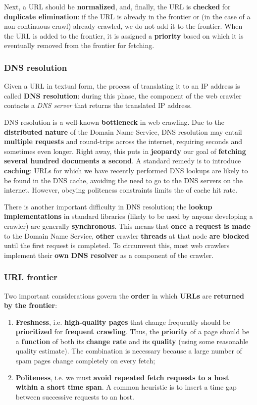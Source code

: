 Next, a URL should be \textbf{normalized}, and, finally,  the URL is \textbf{checked} for \textbf{duplicate elimination}: if the URL is already in the frontier or (in the case of a non-continuous crawl) already crawled, we do not add it to the frontier. When the URL is added to the frontier, it is assigned a \textbf{priority} based on which it is eventually removed from the frontier for fetching.

\subsubsection{DNS resolution}
Given a URL in textual form, the process of translating it to an IP address is called \textbf{DNS resolution}: during this phase, the component of the web crawler contacts a \textit{DNS server} that returns the translated IP address.

DNS resolution is a well-known \textbf{bottleneck} in web crawling. Due to the \textbf{distributed nature} of the Domain Name Service, DNS resolution may entail \textbf{multiple requests} and round-trips across the internet, requiring seconds and sometimes even longer. Right away, this puts in \textbf{jeopardy} our goal of \textbf{fetching several hundred documents a second}. A standard remedy is to introduce \textbf{caching}: URLs for which we have recently performed DNS lookups are likely to be found in the DNS cache, avoiding the need to go to the DNS servers on the internet. However, obeying politeness constraints limits the of cache hit rate. 

There is another important difficulty in DNS resolution; the \textbf{lookup implementations} in standard libraries (likely to be used by anyone developing a crawler) are generally \textbf{synchronous}. This means that \textbf{once a request is made} to the Domain Name Service, \textbf{other} crawler \textbf{threads} at that node \textbf{are blocked} until the first request is completed. To circumvent this, most web crawlers implement their \textbf{own DNS resolver} as a component of the crawler. 

\subsubsection{URL frontier}
Two important considerations govern the \textbf{order} in which \textbf{URLs} are \textbf{returned by the frontier}:

\begin{enumerate}
    \item \textbf{Freshness}, i.e. \textbf{high-quality pages} that change frequently should be \textbf{prioritized} for \textbf{frequent crawling}. Thus, the \textbf{priority} of a page should be a \textbf{function} of both its \textbf{change rate} and its \textbf{quality} (using some reasonable quality estimate). The combination is necessary because a large number of spam pages change completely on every fetch;
    \item \textbf{Politeness}, i.e. we must \textbf{avoid repeated fetch requests to a host within a short time span}. A common heuristic is to insert a time gap between successive requests to an host.
\end{enumerate}

